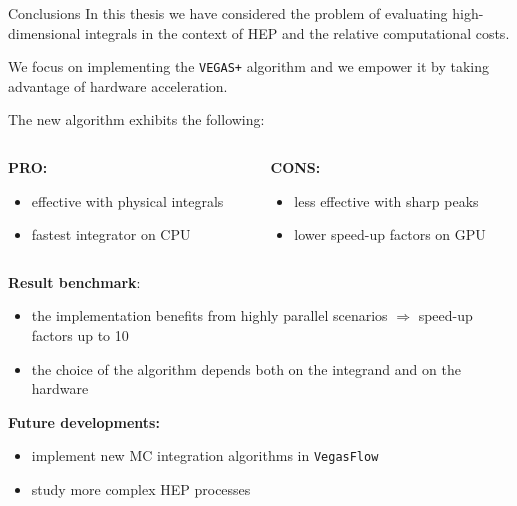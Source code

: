 \documentclass[t,handout,professionalfont,serif]{beamer}
\begin{document}
\begin{frame}{Conclusions}
	\scriptsize
	In this thesis we have considered the problem of evaluating high-dimensional integrals in the context of HEP and 
	the relative computational costs.
	
	We focus on implementing the \texttt{VEGAS+} algorithm and we empower it by taking advantage of hardware acceleration.
	\vspace{0.5cm}
	
	The new algorithm exhibits the following:
\vspace{0.2cm}
	\begin{columns}
		\begin{column}{0.5 \textwidth}
			\textbf{PRO:}
			\begin{itemize}
				\item effective with  physical integrals
				\item fastest integrator on CPU
			\end{itemize}
		\end{column}
			\begin{column}{0.5 \textwidth}
		\textbf{CONS:}
		\begin{itemize}
			\item less effective with sharp peaks
			\item lower speed-up factors on GPU
		\end{itemize}
	\end{column}
	\end{columns}

\vspace{0.5cm}
	
\textbf{Result benchmark}:
	
	\begin{itemize}
		\item the implementation benefits from highly parallel scenarios $\Rightarrow$ speed-up factors up to 10

		\item the choice of the algorithm depends both on the integrand and on the hardware
		
	\end{itemize}
\vspace{0.5cm}

\textbf{Future developments:}
\begin{itemize}
	\item implement new MC integration algorithms in \texttt{VegasFlow}
	\item study more complex HEP processes
\end{itemize}
	
\end{frame}
\end{document}
